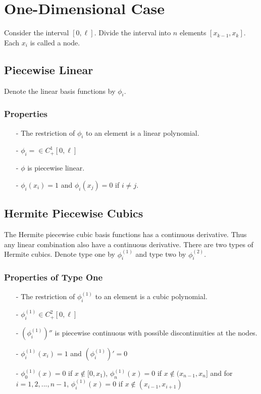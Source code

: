 \documentclass[../../main.tex]{subfiles}
\begin{document}
\section*{One-Dimensional Case}
Consider the interval $[0,\ell]$. Divide the interval into $n$ elements $[x_{k-1},x_k]$. Each $x_i$ is called a node.
\subsection*{Piecewise Linear}
Denote the linear basis functions by $\phi_i$.

\subsubsection{Properties}
\begin{itemize}
	\item[-] The restriction of $\phi_i$ to an element is a linear polynomial.
	\item[-] $\phi_i = \in C^1_+[0, \ell]$
	\item[-] $\phi$ is piecewise linear.
	\item[-] $\phi_i(x_i) = 1$ and $\phi_i(x_j) = 0$ if $i \neq j$.
\end{itemize}


\subsection*{Hermite Piecewise Cubics}
The Hermite piecewise cubic basis functions has a continuous derivative. Thus any linear combination also have a continuous derivative. There are two types of Hermite cubics. Denote type one by $\phi_i^(1)$ and type two by $\phi_i^(2)$.\\

\subsubsection{Properties of Type One}
\begin{itemize}
	\item[-] The restriction of $\phi^{(1)}_i$ to an element is a cubic polynomial.
	\item[-] $\phi^{(1)}_i \in C^2_+[0,\ell]$
	\item[-] $(\phi^{(1)}_i)''$ is piecewise continuous with possible discontinuities at the nodes.
	\item[-] $\phi^{(1)}_i(x_i) = 1$ and $(\phi^{(1)}_i)' = 0$
	\item[-] $\phi^{(1)}_0(x) = 0$ if $x \notin [0,x_1)$, $\phi^{(1)}_n(x) = 0$ if $x \notin (x_{n-1},x_n]$ and for $i = 1,2,...,n-1$, $\phi^{(1)}_i(x) = 0$ if $x \notin (x_{i-1},x_{i+1})$
\end{itemize}
\end{document}
